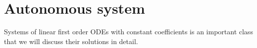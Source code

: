 
\section{Autonomous system}

Systems of linear first order ODEs with constant coefficients is an important class 
that we will discuss their solutions in detail.